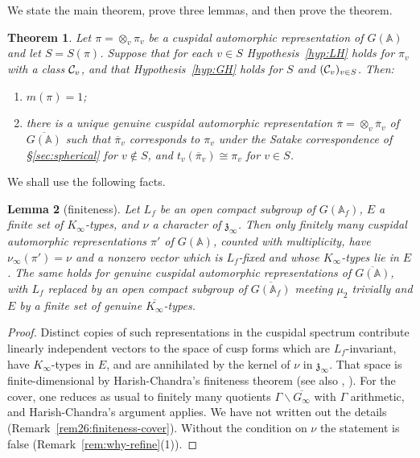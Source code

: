 \documentclass[12pt,letterpaper]{book}
\theoremstyle{plain}
\newtheorem{theorem}{Theorem}[chapter]
\newtheorem{lemma}[theorem]{Lemma}
\theoremstyle{definition}
\theoremstyle{remark}
\theoremstyle{remark}
\begin{document}
We state the main theorem, prove three lemmas, and then prove the theorem.


\begin{theorem}\label{thm:main}
Let $\pi=\otimes_v\pi_v$ be a cuspidal automorphic representation of
$G({\mathbb{A}})$ and let $S=S(\pi)$. Suppose that for each $v\in S$
Hypothesis~\ref{hyp:LH} holds for $\pi_v$ with a class ${\cal C}_v$, and
that Hypothesis~\ref{hyp:GH} holds for $S$ and $({\cal C}_v)_{v\in S}$.
Then:
\begin{enumerate}
\item[(a)] $m(\pi)=1$;
\item[(b)] there is a unique genuine cuspidal automorphic
representation $\overline{\pi}=\otimes_v\overline{\pi}_v$ of
$\overline{G({\mathbb{A}})}$ such that $\overline{\pi}_v$ corresponds to
$\pi_v$ under the Satake correspondence of \S\ref{sec:spherical} for
$v\notin S$, and $t_v(\overline{\pi}_v)\cong\pi_v$ for $v\in S$.
\end{enumerate}
\end{theorem}

We shall use the following facts.

\begin{lemma}[finiteness]\label{lem:finiteness}
Let $L_f$ be an open compact subgroup of $G({\mathbb{A}}_f)$, $E$ a
finite set of $K_\infty$-types, and $\nu$ a character of
$\mathfrak z_\infty$. Then only finitely many cuspidal
automorphic representations $\pi'$ of $G({\mathbb{A}})$, counted with
multiplicity, have $\nu_\infty(\pi')=\nu$ and a nonzero vector which is
$L_f$-fixed and whose $K_\infty$-types lie in $E$. The same holds for
genuine cuspidal automorphic representations of
$\overline{G({\mathbb{A}})}$, with $L_f$ replaced by an open compact
subgroup of $\overline{G({\mathbb{A}}_f)}$ meeting $\mu_2$ trivially and
$E$ by a finite set of genuine $\overline{K_\infty}$-types.
\end{lemma}

\begin{proof}
Distinct copies of such representations in the cuspidal spectrum
contribute linearly independent vectors to the space of cusp forms which
are $L_f$-invariant, have $K_\infty$-types in $E$, and are annihilated by
the kernel of $\nu$ in $\mathfrak z_\infty$. That space is
finite-dimensional by Harish-Chandra's finiteness theorem \cite{HC68}
(see also \cite{BJ}, \cite{MW}). For the cover, one reduces as usual to
finitely many quotients $\Gamma\backslash\overline{G_\infty}$ with
$\Gamma$ arithmetic, and Harish-Chandra's argument applies. We have not
written out the details (Remark~\ref{rem26:finiteness-cover}). Without the
condition on $\nu$ the statement is false (Remark~\ref{rem:why-refine}(1)).
\end{proof}
\end{document}

